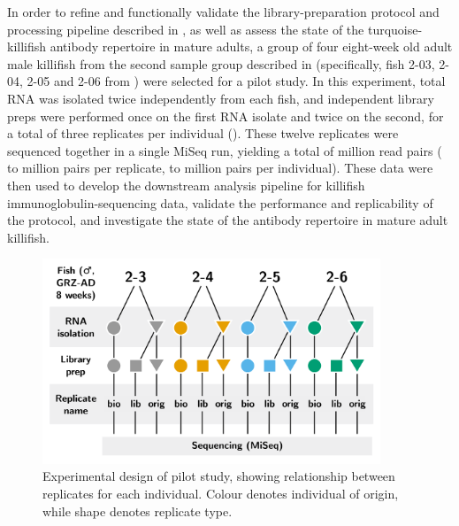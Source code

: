 In order to refine and functionally validate the library-preparation protocol and processing pipeline described in , as well as assess the state of the turquoise-killifish antibody repertoire in mature adults, a group of four eight-week old adult male killifish from the second sample group described in  (specifically, fish 2-03, 2-04, 2-05 and 2-06 from ) were selected for a pilot study. In this experiment, total RNA was isolated twice independently from each fish, and independent library preps were performed once on the first RNA isolate and twice on the second, for a total of three replicates per individual (). These twelve replicates were sequenced together in a single MiSeq run, yielding a total of  million read pairs ( to  million pairs per replicate,  to  million pairs per individual). These data were then used to develop the downstream analysis pipeline for killifish immunoglobulin-sequencing data, validate the performance and replicability of the protocol, and investigate the state of the antibody repertoire in mature adult killifish. %

\begin{figure}
\centering
\includegraphics[width = 0.9\textwidth]{_Figures/png_edited/igseq-pilot-design_wide.png}
\caption{Experimental design of pilot study, showing relationship between replicates for each individual. Colour denotes individual of origin, while shape denotes replicate type.}
\label{fig:igseq-pilot-design}
\end{figure}

